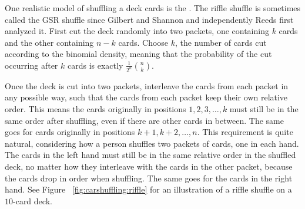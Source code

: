 \documentclass[12pt]{article}
\begin{document}
One realistic model of shuffling a deck cards is the .%
The riffle shuffle is sometimes called the GSR shuffle since Gilbert and
Shannon and independently Reeds first analyzed it.  First cut the deck
randomly into two packets, one containing \( k \) cards and the other
containing \( n-k \) cards.  Choose \( k \), the number of cards cut
according to the binomial density, meaning that the probability of the
cut occurring after \( k \) cards is exactly \( \frac{1}{2^n}\binom{n}{k}
\).

Once the deck is cut into two packets, interleave the cards from each
packet in any possible way, such that the cards from each packet keep
their own relative order.  This means the cards originally in positions \(
1, 2, 3, \dots, k \) must still be in the same order after shuffling,
even if there are other cards in between.  The same goes for cards
originally in positions \( k+1, k+2, \dots, n \).  This requirement is
quite natural, considering how a person shuffles two packets of
cards, one in each hand.  The cards in the left hand must still be in
the same relative order in the shuffled deck, no matter how they
interleave with the cards in the other packet, because the cards drop in
order when shuffling.  The same goes for the cards in the right hand.
See Figure~%
\ref{fig:carshuffling:riffle} for an illustration of a riffle shuffle on
a \( 10 \)-card deck.
\end{document}

